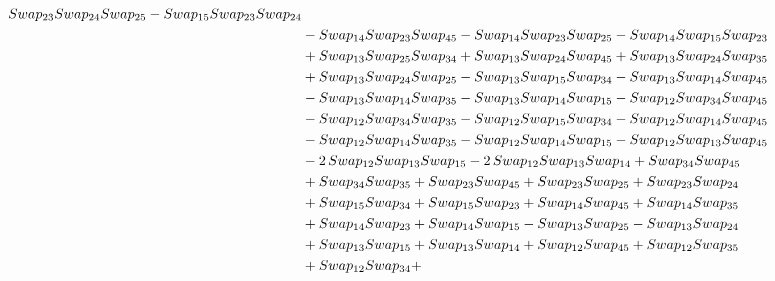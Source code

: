\documentclass[10pt,a4paper]{amsart}
\begin{document}
\begin{align*}
        \textnormal{Swap}_{23} \textnormal{Swap}_{24} \textnormal{Swap}_{25} - \textnormal{Swap}_{15} \textnormal{Swap}_{23} \textnormal{Swap}_{24}\\ & - \textnormal{Swap}_{14} \textnormal{Swap}_{23} \textnormal{Swap}_{45} - \textnormal{Swap}_{14} \textnormal{Swap}_{23} \textnormal{Swap}_{25} - \textnormal{Swap}_{14} \textnormal{Swap}_{15} \textnormal{Swap}_{23}\\ & +
        \textnormal{Swap}_{13} \textnormal{Swap}_{25} \textnormal{Swap}_{34} + \textnormal{Swap}_{13} \textnormal{Swap}_{24} \textnormal{Swap}_{45} + \textnormal{Swap}_{13} \textnormal{Swap}_{24} \textnormal{Swap}_{35}\\ & + \textnormal{Swap}_{13} \textnormal{Swap}_{24} \textnormal{Swap}_{25} - \textnormal{Swap}_{13} \textnormal{Swap}_{15} \textnormal{Swap}_{34} -
        \textnormal{Swap}_{13} \textnormal{Swap}_{14} \textnormal{Swap}_{45}\\ & - \textnormal{Swap}_{13} \textnormal{Swap}_{14} \textnormal{Swap}_{35} - \textnormal{Swap}_{13} \textnormal{Swap}_{14} \textnormal{Swap}_{15} - \textnormal{Swap}_{12} \textnormal{Swap}_{34} \textnormal{Swap}_{45}\\ & - \textnormal{Swap}_{12} \textnormal{Swap}_{34} \textnormal{Swap}_{35} -
        \textnormal{Swap}_{12} \textnormal{Swap}_{15} \textnormal{Swap}_{34} - \textnormal{Swap}_{12} \textnormal{Swap}_{14} \textnormal{Swap}_{45}\\ & - \textnormal{Swap}_{12} \textnormal{Swap}_{14} \textnormal{Swap}_{35} - \textnormal{Swap}_{12} \textnormal{Swap}_{14} \textnormal{Swap}_{15} - \textnormal{Swap}_{12} \textnormal{Swap}_{13} \textnormal{Swap}_{45}\\ & -
        2\,\textnormal{Swap}_{12} \textnormal{Swap}_{13} \textnormal{Swap}_{15} - 2\,\textnormal{Swap}_{12} \textnormal{Swap}_{13} \textnormal{Swap}_{14} + \textnormal{Swap}_{34} \textnormal{Swap}_{45}\\ & + \textnormal{Swap}_{34} \textnormal{Swap}_{35} + \textnormal{Swap}_{23} \textnormal{Swap}_{45} + \textnormal{Swap}_{23} \textnormal{Swap}_{25} +
        \textnormal{Swap}_{23} \textnormal{Swap}_{24}\\ & + \textnormal{Swap}_{15} \textnormal{Swap}_{34} + \textnormal{Swap}_{15} \textnormal{Swap}_{23} + \textnormal{Swap}_{14} \textnormal{Swap}_{45} + \textnormal{Swap}_{14} \textnormal{Swap}_{35}\\ & + \textnormal{Swap}_{14} \textnormal{Swap}_{23} + \textnormal{Swap}_{14} \textnormal{Swap}_{15} -
        \textnormal{Swap}_{13} \textnormal{Swap}_{25} - \textnormal{Swap}_{13} \textnormal{Swap}_{24}\\ & + \textnormal{Swap}_{13} \textnormal{Swap}_{15} + \textnormal{Swap}_{13} \textnormal{Swap}_{14} + \textnormal{Swap}_{12} \textnormal{Swap}_{45} + \textnormal{Swap}_{12} \textnormal{Swap}_{35}\\ & + \textnormal{Swap}_{12} \textnormal{Swap}_{34} +

\end{align*}
\end{document}
